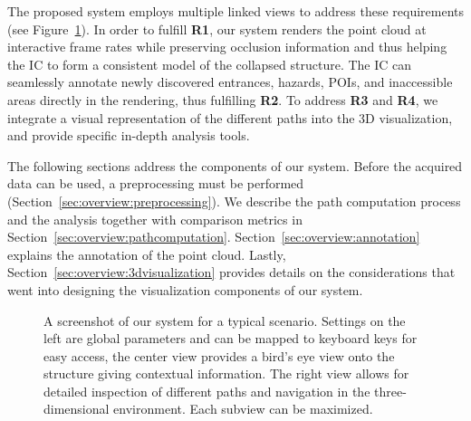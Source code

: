 \documentclass{egpubl}
\begin{document}
The proposed system employs multiple linked views to address these requirements (see Figure~\ref{sec:overview:system}). In order to fulfill {\bfseries R1}, our system renders the point cloud at interactive frame rates while preserving occlusion information and thus helping the IC to form a consistent model of the collapsed structure. The IC can seamlessly annotate newly discovered entrances, hazards, POIs, and inaccessible areas directly in the rendering, thus fulfilling {\bfseries R2}. To address {\bfseries R3} and {\bfseries R4}, we integrate a visual representation of the different paths into the 3D visualization, and provide specific in-depth analysis tools.

The following sections address the components of our system. Before the acquired data can be used, a preprocessing must be performed (Section~\ref{sec:overview:preprocessing}). We describe the path computation process and the analysis together with comparison metrics in Section~\ref{sec:overview:pathcomputation}. Section~\ref{sec:overview:annotation} explains the annotation of the point cloud. Lastly, Section~\ref{sec:overview:3dvisualization} provides details on the considerations that went into designing the visualization components of our system.

\begin{figure}
	\newcommand{\abSystemScreenshotWidth}{\columnwidth}
    \centering
    \caption{A screenshot of our system for a typical scenario. Settings on the left are global parameters and can be mapped to keyboard keys for easy access, the center view provides a bird's eye view onto the structure giving contextual information. The right view allows for detailed inspection of different paths and navigation in the three-dimensional environment. Each subview can be maximized.}
    \label{sec:overview:system}
\end{figure}
\end{document}
